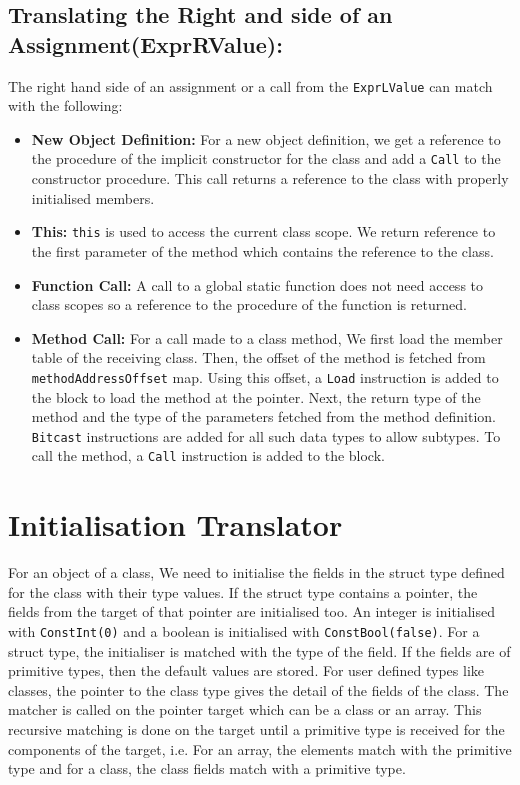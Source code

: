 \documentclass[]{tukportfolio}
\begin{document}
	\subsection{Translating the Right and side of an Assignment(ExprRValue):}\label{ExprRValue} The right hand side of an assignment or a call from the \lstinline|ExprLValue|  can match with the following:
		
		\begin{itemize}
			\item \textbf{New Object Definition:} For a new object definition, we get a reference to the procedure of the implicit constructor for the class and add a \lstinline|Call| to the constructor procedure. This call returns a reference to the class with properly initialised members.
			\item \textbf{This:} \lstinline|this| is used to access the current class scope. We return  reference to the first parameter of the method which contains the reference to the class.
			\item \textbf{Function Call:} A call to a global static function does not need access to class scopes so a reference to the procedure of the function is returned.
			\item \textbf{Method Call:} For a call made to a class method, We first load the member table of the receiving class. Then, the offset of the method is fetched from \lstinline|methodAddressOffset| map. Using this offset, a \lstinline|Load| instruction is added to the block to load the method at the pointer. Next, the return type of the method and the type of the parameters fetched from the method definition. \lstinline|Bitcast| instructions are added for all such data types to allow subtypes. To call the method, a \lstinline|Call| instruction is added to the block.
		\end{itemize}
\section{Initialisation Translator} \label{initialisationTranslator}
	For an object of a class, We need to initialise the fields in the struct type defined for the class with their type values. If the struct type contains a pointer, the fields from the target of that pointer are initialised too. An integer is initialised with \lstinline|ConstInt(0)| and a boolean is initialised with \lstinline|ConstBool(false)|. For a struct type, the initialiser is matched with the type of the field. If the fields are of primitive types, then the default values are stored. For user defined types like classes, the pointer to the class type gives the detail of the fields of the class. The matcher is called on the pointer target which can be a class or an array. This recursive matching is done on the target until a primitive type is received for the components of the target, i.e. For an array, the elements match with the primitive type and for a class, the class fields match with a primitive type.
\newpage
\end{document}
